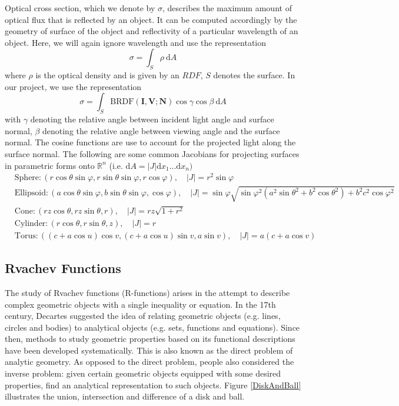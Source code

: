 \documentclass[11pt,reqno]{amsart}
\newcommand{\BRDF}{\mathrm{BRDF}}
\theoremstyle{definition}
\begin{document}
Optical cross section, which we denote by $\sigma$, describes the maximum amount of optical flux that is reflected by an object. It can be computed accordingly by the geometry of surface of the object and reflectivity of a particular wavelength of an object. Here, we will again ignore wavelength and use the representation 
$$\sigma=\int_{S} \rho \: \mathrm{d}A$$
where $\rho$ is the optical density and is given by an $RDF$, $S$ denotes the surface. In our project, we use the representation
$$\sigma= \int_S\BRDF(\mathbf{I},\mathbf{V};\mathbf{N}) \cos\gamma\cos\beta \: \mathrm{d}A$$
with $\gamma$ denoting the relative angle between incident light angle and surface normal, $\beta$ denoting the relative angle between viewing angle and the surface normal. The cosine functions are use to account for the projected light along the surface normal. The following are some common Jacobians for projecting surfaces in parametric forms onto $\mathbb{R}^n$ (i.e. $\mathrm d A= |J| \mathrm{d}x_1...\mathrm{d}x_n)$
\begin{align}
&\nonumber\mbox{Sphere}:( r\cos\theta \sin\varphi, r\sin\theta \sin\varphi,  r\cos\varphi),   \quad |J|= r^2\sin\varphi         \\
&\nonumber\mbox{Ellipsoid} :(a\cos\theta \sin\varphi,b\sin\theta \sin\varphi,\cos\varphi),    \quad |J|=\sin\varphi  \sqrt{\sin\varphi^2( a^2\sin\theta^2+b^2\cos\theta^2)+b^2c^2\cos\varphi^2}       \\ 
&\nonumber\mbox{Cone}: (rz\cos\theta , rz\sin\theta , r),\quad |J|= rz\sqrt{1+r^2}        \\
&\nonumber\mbox{Cylinder}: ( r\cos\theta ,r\sin\theta, z), \quad |J|=r                \\
&\nonumber\mbox{Torus} :    ((c+a\cos u) \cos v,(c+a\cos u) \sin v, a\sin v), \quad |J|= a(c+a\cos v)           
\end{align}

\subsection{Rvachev Functions}
The study of Rvachev functions (R-functions) arises in the attempt
to describe complex geometric objects with a single inequality or equation. In the
17th century, Decartes suggested the idea of relating geometric objects (e.g.
lines, circles and bodies) to analytical objects (e.g. sets, functions and
equations). Since then, methods to study geometric properties based on its
functional descriptions have been developed systematically. This is also known
as the direct problem of analytic geometry. As opposed to the direct problem,
people also considered the inverse problem: given certain geometric objects
equipped with some desired properties, find an analytical representation to
such objects. Figure \ref{DiskAndBall} illustrates the union, intersection and difference of a disk and ball. 
\end{document}
